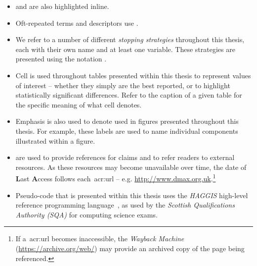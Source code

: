 \begin{preamble}
\begin{itemize}
\begin{itemize}
        \item{ and  are also highlighted inline.}
        
        \item{Oft-repeated terms and descriptors use .}
        
        \item{We refer to a number of different \emph{stopping strategies} throughout this thesis, each with their own name and at least one variable. These strategies are presented using the notation .}
        
        \item{Cell  is used throughout tables presented within this thesis to represent values of interest -- whether they simply are the best reported, or to highlight statistically significant differences. Refer to the caption of a given table for the specific meaning of what cell  denotes.}
        
        \item{Emphasis is also used to denote  used in figures presented throughout this thesis. For example, these labels are used to name individual components illustrated within a figure.}
        
    \end{itemize}
\end{itemize}

\noindent{}\vspace*{-4mm}
\begin{itemize}
    \item{ are used to provide references for claims and to refer readers to external resources. As these resources may become unavailable over time, the date of \textbf{L}ast \textbf{A}ccess follows each~\gls{acr:url} -- e.g. \url{http://www.dmax.org.uk}.\footnote{If a~\gls{acr:url} becomes inaccessible, the \emph{Wayback Machine} (\url{https://archive.org/web/}) may provide an archived copy of the page being referenced.}}
\end{itemize}

\noindent{}
\begin{itemize}
    \item{Pseudo-code that is presented within this thesis uses the \emph{HAGGIS} high-level reference programming language~\citep{cutts2014haggis}, as used by the \emph{Scottish Qualifications Authority (SQA)} for computing science exams.}
    

\end{itemize}
\end{preamble}
